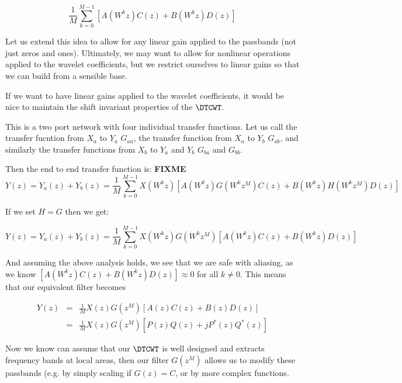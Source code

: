 \begin{equation}
  \frac{1}{M} \sum_{k=0}^{M-1} [A(W^kz)C(z) + B(W^kz)D(z)]
\end{equation}

Let us extend this idea to allow for any linear gain applied to the passbands
(not just zeros and ones). Ultimately, we may want to allow for nonlinear
operations applied to the wavelet coefficients, but we restrict ourselves to
linear gains so that we can build from a sensible base.

If we want to have linear gains applied to the wavelet coefficients, it would be
nice to maintain the shift invariant properties of the $\DTCWT$. 

\begin{figure}
  \centering
  
  \label{fig:ch6:dtcwt_two_tree_gain}
\end{figure}

This is a two port network with four individual transfer functions. Let us call
the transfer fucntion from $X_a$ to $Y_a$ $G_{aa}$, the transfer function from
$X_a$ to $Y_b$ $G_{ab}$, and similarly the transfer functions from $X_b$ to
$Y_a$ and $Y_b$ $G_{ba}$ and $G_{bb}$.

Then the end to end transfer function is: \textbf{FIXME}
\begin{equation}
Y(z) = Y_{a}(z) + Y_{b}(z) = \frac{1}{M} \sum_{k=0}^{M-1} X(W^k z) [A(W^kz)G(W^kz^{M})C(z) + B(W^kz)H(W^kz^{M})D(z)]
\end{equation}

If we set $H=G$ then we get:

$$Y(z) = Y_{a}(z) + Y_{b}(z) = \frac{1}{M} \sum_{k=0}^{M-1} X(W^k z)G(W^kz^{M}) [A(W^kz)C(z) + B(W^kz)D(z)]$$

And assuming the above analysis holds, we see that we are safe with aliasing, as
we know $[A(W^kz)C(z) + B(W^kz)D(z)] \approx 0$ for all $k\neq 0$. This means
that our equivalent filter becomes

\begin{eqnarray}
  Y(z) &=& \frac{1}{M} X(z)G(z^{M}) [A(z)C(z) + B(z)D(z)] \\
  &=& \frac{1}{M} X(z)G(z^{M}) [P(z)Q(z) + jP^{*}(z)Q^{*}(z)]
\end{eqnarray}

Now we know can assume that our $\DTCWT$ is well designed and extracts frequency
bands at local areas, then our filter $G(z^{M})$ allows us to modify these
passbands (e.g. by simply scaling if $G(z) = C$, or by more complex functions.


